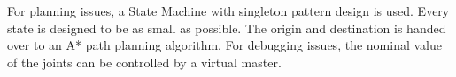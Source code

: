 For planning issues, a State Machine with singleton pattern design is used. Every state is designed
to be as small as possible. The origin and destination is handed over to an A* path planning
algorithm. For debugging issues, the nominal value of the joints can be controlled by a virtual
master.

